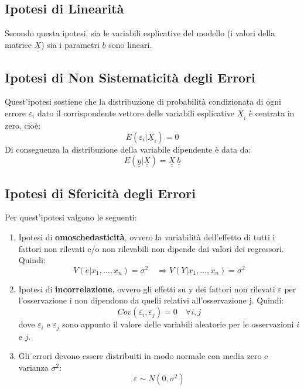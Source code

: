 \documentclass[]{article}
\def\doubleunderline#1{\underline{\underline{#1}}}
\begin{document}
\subsection{Ipotesi di Linearità}
Secondo questa ipotesi, sia le variabili esplicative del modello (i valori della matrice $\doubleunderline{X}$) sia i parametri $\underline{b}$ sono lineari.

\subsection{Ipotesi di Non Sistematicità degli Errori}
Quest'ipotesi sostiene che la distribuzione di probabilità condizionata di ogni errore $\varepsilon_i$ dato il corrispondente vettore delle variabili esplicative $\underline{X}_i$ è centrata in zero, cioè:
\begin{equation}
E\left(\varepsilon_i|\underline{X}_i\right) = 0
\end{equation}
Di conseguenza la distribuzione della variabile dipendente è data da:
\begin{equation}
E\left(\underline{y}|\doubleunderline{X}\right) = \doubleunderline{X}\ \underline{b}
\end{equation}

\subsection{Ipotesi di Sfericità degli Errori}
Per quest'ipotesi valgono le seguenti:
\begin{enumerate}
\item Ipotesi di \textbf{omoschedasticità}, ovvero la  variabilità  dell'effetto  di  tutti  i  fattori  non  rilevati  e/o  non  rilevabili  non  dipende  dai 
valori dei regressori. Quindi:
\begin{equation}
V(e \vert x_1, \dots, x_n) = \sigma^2 \quad \Rightarrow V(Y \vert x_1, \dots, x_n) = \sigma^2
\end{equation}
\item Ipotesi di \textbf{incorrelazione}, ovvero gli  effetti su y dei  fattori  non  rilevati $\varepsilon$  per  l'osservazione i non  dipendono  da  quelli relativi all'osservazione j. Quindi:
\begin{equation}
Cov(\varepsilon_i, \varepsilon_j) = 0 \quad \forall i, j
\end{equation}
dove $\varepsilon_i$ e $\varepsilon_j$ sono appunto il valore delle variabili aleatorie per le osservazioni $i$ e $j$.
\item Gli errori devono essere distribuiti in modo normale con media zero e varianza $\sigma^2$:
\begin{equation}
\varepsilon \sim N(0,\sigma^2)
\end{equation}
\end{enumerate}
\end{document}
